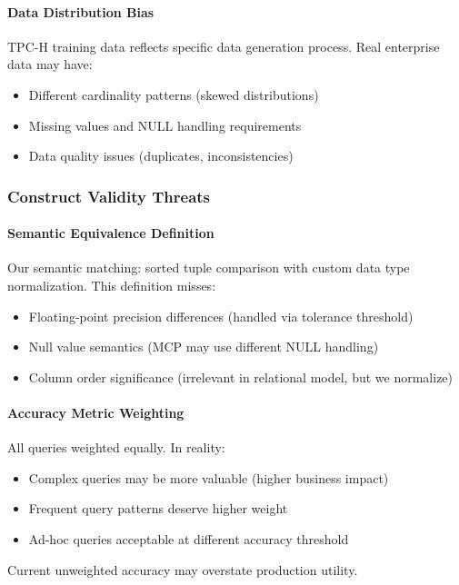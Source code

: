 \paragraph{Data Distribution Bias}
TPC-H training data reflects specific data generation process. Real enterprise data may have:
\begin{itemize}
    \item Different cardinality patterns (skewed distributions)
    \item Missing values and NULL handling requirements
    \item Data quality issues (duplicates, inconsistencies)
\end{itemize}

\subsubsection{Construct Validity Threats}

\paragraph{Semantic Equivalence Definition}
Our semantic matching: sorted tuple comparison with custom data type normalization. This definition misses:
\begin{itemize}
    \item Floating-point precision differences (handled via tolerance threshold)
    \item Null value semantics (MCP may use different NULL handling)
    \item Column order significance (irrelevant in relational model, but we normalize)
\end{itemize}

\paragraph{Accuracy Metric Weighting}
All queries weighted equally. In reality:
\begin{itemize}
    \item Complex queries may be more valuable (higher business impact)
    \item Frequent query patterns deserve higher weight
    \item Ad-hoc queries acceptable at different accuracy threshold
\end{itemize}

Current unweighted accuracy may overstate production utility.

